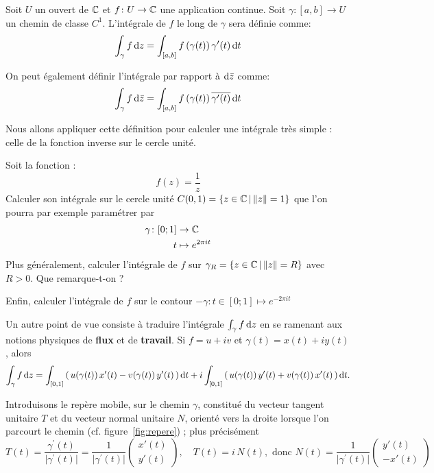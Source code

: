 \begin{fdefn}
\label{def:integration_chemin}
Soit $U$ un ouvert de $\mathbb{C}$ et $f \colon U \to \mathbb{C}$ une application continue. Soit $\gamma \colon [a,b] \to U$ un chemin de classe $C^1$. 
L'intégrale de $f$ le long de $\gamma$ sera définie comme:
\[
\int_{\gamma}f \mathop{}\mathopen{}\mathrm{d} z = \int_{[a,b]}f\left(\gamma(t)\right)\gamma^\prime(t)\mathop{}\mathopen{}\mathrm{d} t
\]
\end{fdefn}
\begin{rem}
On peut également définir l'intégrale par rapport à $\mathop{}\mathopen{}\mathrm{d} \bar{z}$ comme:
\[
\int_{\gamma}f \mathop{}\mathopen{}\mathrm{d} \bar{z} = \int_{[a,b]}f\left(\gamma(t)\right)\overline{\gamma^\prime(t)} \mathop{}\mathopen{}\mathrm{d} t
\]
\end{rem}

Nous allons appliquer cette définition pour calculer une intégrale très simple : celle de la fonction inverse sur le cercle unité.
\begin{exercice} \label{ex:int_1surz}
Soit la fonction :
\[f(z)= \frac{1}{z}
\]
Calculer son intégrale sur le cercle unité $C(0,1) = \{ z \in \mathbb{C} \, | \, \| z \| = 1 \}$ que l'on pourra par exemple paramétrer par
\begin{align*}
    \gamma \colon [0;1] & \to \mathbb{C} \\
                     t  & \mapsto e^{2 \pi i t}
\end{align*}
Plus généralement, calculer l'intégrale de $f$ sur $\gamma_R = \{ z \in \mathbb{C} \, | \, \| z \| = R \}$ avec $R > 0$. Que remarque-t-on ?

Enfin, calculer l'intégrale de $f$ sur le contour $- \gamma : t \in [0;1] \mapsto e^{-2 \pi i t}$
\end{exercice}

Un autre point de vue consiste à traduire l'intégrale $\int_{\gamma}f \mathop{}\mathopen{}\mathrm{d} z$ en se ramenant aux notions physiques de \textbf{flux} et de \textbf{travail}.
Si $f=u + i v$ et $\gamma(t)=x(t) + i y(t)$, alors
\[\int_{\gamma}f \mathop{}\mathopen{}\mathrm{d} z =\int_{[0,1]} \left(\, u(\gamma(t))\, x^\prime(t) - v(\gamma(t))\, y^\prime(t)\, \right) \mathop{}\mathopen{}\mathrm{d} t + i \int_{[0,1]} \left(\, u(\gamma(t))\, y^\prime(t) + v(\gamma(t))\, x^\prime(t)\, \right) \mathop{}\mathopen{}\mathrm{d} t.\]

Introduisons le repère mobile, sur le chemin $\gamma$, constitué du vecteur tangent unitaire $T$ et du vecteur normal unitaire $N$, orienté vers la droite lorsque l'on parcourt le chemin (cf. figure~\ref{fig:repere}) ; plus précisément
\[T(t)=\frac{\gamma^\prime(t)}{\lvert\gamma^\prime(t)\rvert} = \frac{1}{\lvert\gamma^\prime(t)\rvert}\begin{pmatrix} x'(t) \\ y'(t) \end{pmatrix}, \quad T(t)=i \, N(t), \text{ donc } N(t) = \frac{1}{\lvert\gamma^\prime(t)\rvert}\begin{pmatrix}y'(t) \\ -x'(t)\end{pmatrix}\]


